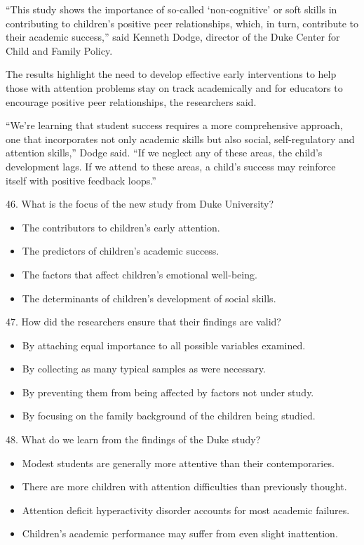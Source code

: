 \documentclass[UTF8,11pt]{ctexart}
\begin{document}
“This study shows the importance of so-called ‘non-cognitive’ or soft skills in contributing to children’s positive peer relationships, which, in turn, contribute to their academic success,” said Kenneth Dodge, director of the Duke Center for Child and Family Policy.


The results highlight the need to develop effective early interventions to help those with attention problems stay on track academically and for educators to encourage positive peer relationships, the researchers said.


“We’re learning that student success requires a more comprehensive approach, one that incorporates not only academic skills but also social, self-regulatory and attention skills,” Dodge said. “If we neglect any of these areas, the child’s development lags. If we attend to these areas, a child’s success may reinforce itself with positive feedback loops.”


46. What is the focus of the new study from Duke University?


\begin{itemize}[leftmargin=2em,itemsep=.2em,topsep=.4em]\item[A.] The contributors to children’s early attention.
\item[B.] The predictors of children’s academic success.
\item[C.] The factors that affect children’s emotional well-being.
\item[D.] The determinants of children’s development of social skills.
\end{itemize}

47. How did the researchers ensure that their findings are valid?


\begin{itemize}[leftmargin=2em,itemsep=.2em,topsep=.4em]\item[A.] By attaching equal importance to all possible variables examined.
\item[B.] By collecting as many typical samples as were necessary.
\item[C.] By preventing them from being affected by factors not under study.
\item[D.] By focusing on the family background of the children being studied.
\end{itemize}

48. What do we learn from the findings of the Duke study?


\begin{itemize}[leftmargin=2em,itemsep=.2em,topsep=.4em]\item[A.] Modest students are generally more attentive than their contemporaries.
\item[B.] There are more children with attention difficulties than previously thought.
\item[C.] Attention deficit hyperactivity disorder accounts for most academic failures.
\item[D.] Children’s academic performance may suffer from even slight inattention.
\end{itemize}
\end{document}
